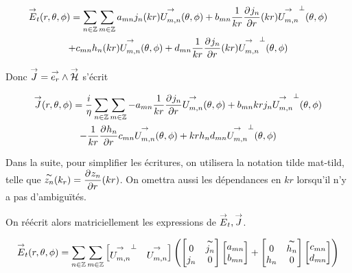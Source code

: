         \begin{multline}
            \vE_t(\rtp) = \sum_{n\in\ZZ}\sum_{m\in\ZZ} a_{mn} j_n(kr)\Umn(\tp) + b_{mn} \frac{1}{kr}\ddr{r}{j_n}(kr)\Umn^\perp(\tp)
            \\
            + c_{mn} h_n(kr)\Umn(\tp) + d_{mn} \frac{1}{kr}\ddr{r}{j_n}(kr)\Umn^\perp(\tp)
        \end{multline}


        Donc \(\vJ = \vect{e_r} \pvect \vH\) s'écrit

        \begin{multline}
            \vJ(\rtp) = \frac{i}{\eta}\sum_{n\in\ZZ}\sum_{m\in\ZZ} - a_{mn} \frac{1}{kr}\ddr{r}{j_n}\Umn(\tp) + b_{mn} k r j_n \Umn^\perp(\tp)
            \\
            -  \frac{1}{kr}\ddr{r}{h_n} c_{mn} \Umn(\tp) + k r h_n d_{mn} \Umn^\perp(\tp)
        \end{multline}

        Dans la suite, pour simplifier les écritures, on utilisera la notation tilde \gls{mat-tild}, telle que \( \tilde{z_n}(k_r) = \ddr{r}{z_n}(kr) \). On omettra aussi les dépendances en \(kr\) lorsqu'il n'y a pas d’ambiguïtés.

        On réécrit alors matriciellement les expressions de \(\vE_t,\vJ\).

        \begin{equation}
            \vE_t(\rtp) = \sum_{n\in\ZZ}\sum_{m\in\ZZ}
            \begin{bmatrix}
              \Umn^\perp & \Umn
            \end{bmatrix}
            \left(
              \begin{bmatrix}
                  0 & \tilde{j_n}
                  \\
                  j_n & 0
              \end{bmatrix}
              \begin{bmatrix}
                  a_{mn}
                  \\
                  b_{mn}
              \end{bmatrix}
              +
              \begin{bmatrix}
                  0 & \tilde{h_n}
                  \\
                  h_n & 0
              \end{bmatrix}
              \begin{bmatrix}
                  c_{mn}
                  \\
                  d_{mn}
              \end{bmatrix}
            \right)
        \end{equation}


